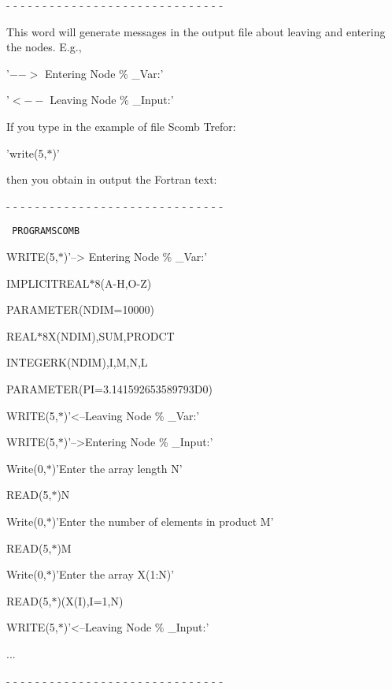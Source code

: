 - - - - - - - - - - - - - - - - - - - - - - - - - - - - - -


\par\noindent This word will generate messages in the output
file about leaving and entering the nodes. E.g.,

\qquad \quad     '$-->$ Entering Node \% \_Var:'

\qquad \quad     '$<--$ Leaving  Node \% \_Input:'

\par\indent If you type in the example of file Scomb Trefor:

 'write(5,$*$)'

\par\indent then you obtain in output the Fortran text:

- - - - - - - - - - - - - - - - - - - - - - - - - - - - - -

{\tt
\qquad \quad      PROGRAMSCOMB

\qquad \quad      WRITE(5,$*$)'--> Entering Node \% \_Var:'

\qquad \quad      IMPLICITREAL$*$8(A-H,O-Z)

\qquad \quad      PARAMETER(NDIM=10000)

\qquad \quad      REAL$*$8X(NDIM),SUM,PRODCT

\qquad \quad      INTEGERK(NDIM),I,M,N,L

\qquad \quad      PARAMETER(PI=3.141592653589793D0)

\qquad \quad      WRITE(5,$*$)'<--Leaving  Node \% \_Var:'

\qquad \quad      WRITE(5,$*$)'-->Entering Node \% \_Input:'

\qquad \quad      Write(0,$*$)'Enter the array length N'

\qquad \quad      READ(5,$*$)N

\qquad \quad      Write(0,$*$)'Enter the number of elements in product M'

\qquad \quad      READ(5,$*$)M

\qquad \quad      Write(0,$*$)'Enter the array X(1:N)'

\qquad \quad      READ(5,$*$)(X(I),I=1,N)

\qquad \quad      WRITE(5,$*$)'<--Leaving  Node \% \_Input:'

\qquad \quad       ... }

 - - - - - - - - - - - - - - - - - - - - - - - - - - - - - -

